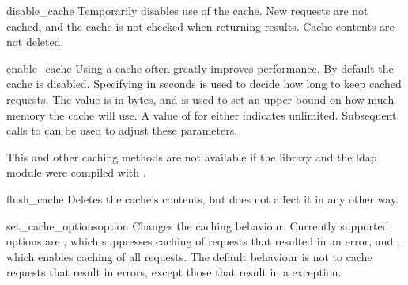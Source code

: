
\begin{methoddesc}[LDAP]{disable_cache}{}
Temporarily disables use of the cache. New requests are not cached, and
the cache is not checked when returning results. Cache contents are not
deleted.
\end{methoddesc}


\begin{methoddesc}[LDAP]{enable_cache}{}
Using a cache often greatly improves performance. By default the cache
is disabled. Specifying  in seconds is used to decide how long
to keep cached requests. The  value is in bytes, and is used
to set an upper bound on how much memory the cache will use. A value of
 for either indicates unlimited. 
Subsequent calls to
 can be used to adjust these parameters.

This and other caching methods are not available if the library and the 
ldap module were compiled with .
\end{methoddesc}


\begin{methoddesc}[LDAP]{flush_cache}{}
Deletes the cache's contents, but does not affect it in any other way.
\end{methoddesc}


\begin{methoddesc}[LDAP]{set_cache_options}{option}
Changes the caching behaviour. Currently supported options are
    , which suppresses caching of requests
    	that resulted in an error, and
    , which enables caching of all requests.
The default behaviour is not to cache requests that result in errors, except 
those that result in a  exception.
\end{methoddesc}


